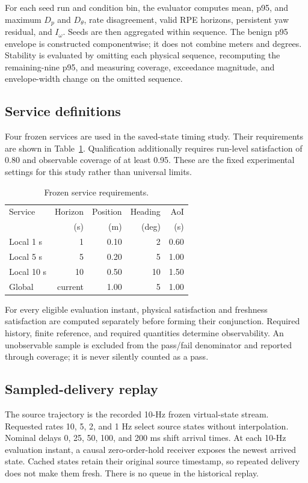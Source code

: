 \documentclass[journal,onecolumn]{IEEEtran}
\begin{document}
For each seed run and condition bin, the evaluator computes mean, p95, and maximum $D_p$ and $D_\theta$, rate disagreement, valid RPE horizons, persistent yaw residual, and $I_\omega$. Seeds are then aggregated within sequence. The benign p95 envelope is constructed componentwise; it does not combine meters and degrees. Stability is evaluated by omitting each physical sequence, recomputing the remaining-nine p95, and measuring coverage, exceedance magnitude, and envelope-width change on the omitted sequence.

\subsection{Service definitions}
Four frozen services are used in the saved-state timing study. Their requirements are shown in Table~\ref{tab:services}. Qualification additionally requires run-level satisfaction of 0.80 and observable coverage of at least 0.95. These are the fixed experimental settings for this study rather than universal limits.

\begin{table}[ht]
\centering
\caption{Frozen service requirements.}
\label{tab:services}
\begin{tabular}{lrrrr}
\toprule
Service & Horizon & Position & Heading & AoI \\
 & (s) & (m) & (deg) & (s) \\
\midrule
Local 1 s & 1 & 0.10 & 2 & 0.60 \\
Local 5 s & 5 & 0.20 & 5 & 1.00 \\
Local 10 s & 10 & 0.50 & 10 & 1.50 \\
Global & current & 1.00 & 5 & 1.00 \\
\bottomrule
\end{tabular}
\end{table}

For every eligible evaluation instant, physical satisfaction and freshness satisfaction are computed separately before forming their conjunction. Required history, finite reference, and required quantities determine observability. An unobservable sample is excluded from the pass/fail denominator and reported through coverage; it is never silently counted as a pass.

\subsection{Sampled-delivery replay}
The source trajectory is the recorded 10-Hz frozen virtual-state stream. Requested rates 10, 5, 2, and 1 Hz select source states without interpolation. Nominal delays 0, 25, 50, 100, and 200 ms shift arrival times. At each 10-Hz evaluation instant, a causal zero-order-hold receiver exposes the newest arrived state. Cached states retain their original source timestamp, so repeated delivery does not make them fresh. There is no queue in the historical replay.
\end{document}
